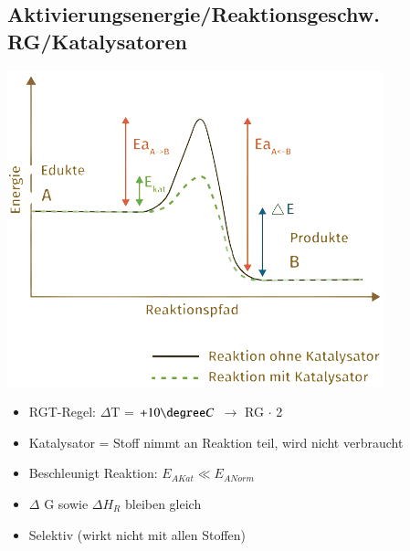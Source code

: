 \subsection{Aktivierungsenergie/Reaktionsgeschw. RG/Katalysatoren}\label{Reaktionsgeschw}
\begin{minipage}{0.32\linewidth}
    \includegraphics[width=\linewidth]{pictures/Katalysator_1.png}
\end{minipage}
\hfill
\begin{minipage}{0.65\linewidth}
    \begin{itemize}
        \item RGT-Regel: $\Delta$T = $+10\degree C$ $\rightarrow$ RG $\cdot$ 2
        \item Katalysator = Stoff nimmt an Reaktion teil, wird nicht verbraucht 
        \item Beschleunigt Reaktion: $E_{AKat} \ll E_{ANorm}$
        \item $\Delta$ G sowie $\Delta H_R$ bleiben gleich
        \item Selektiv (wirkt nicht mit allen Stoffen)
    \end{itemize}
\end{minipage}
